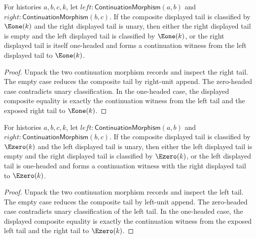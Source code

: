 \begin{theorem}
\label{thm:category-continuation-composite-e1-tail-right-cases}
For histories $a,b,c,k$, let
$left:\mathsf{ContinuationMorphism}(a,b)$ and
$right:\mathsf{ContinuationMorphism}(b,c)$. If the composite displayed tail is
classified by $\Eone(k)$ and the right displayed tail is unary, then either the
right displayed tail is empty and the left displayed tail is classified by
$\Eone(k)$, or the right displayed tail is itself one-headed and forms a
continuation witness from the left displayed tail to $\Eone(k)$.
\end{theorem}
\begin{proof}
Unpack the two continuation morphism records and inspect the right tail. The
empty case reduces the composite tail by right-unit append. The zero-headed
case contradicts unary classification. In the one-headed case, the displayed
composite equality is exactly the continuation witness from the left tail and
the exposed right tail to $\Eone(k)$.
\end{proof}

\begin{theorem}
\label{thm:continuation-morphism-comp-e0-tail-left-cases}
For histories $a,b,c,k$, let
$left:\mathsf{ContinuationMorphism}(a,b)$ and
$right:\mathsf{ContinuationMorphism}(b,c)$. If the composite displayed tail is
classified by $\Ezero(k)$ and the left displayed tail is unary, then either the
left displayed tail is empty and the right displayed tail is classified by
$\Ezero(k)$, or the left displayed tail is one-headed and forms a continuation
witness with the right displayed tail to $\Ezero(k)$.
\end{theorem}
\begin{proof}
Unpack the two continuation morphism records and inspect the left tail. The
empty case reduces the composite tail by left-unit append. The zero-headed
case contradicts unary classification of the left tail. In the one-headed
case, the displayed composite equality is exactly the continuation witness
from the exposed left tail and the right tail to $\Ezero(k)$.
\end{proof}

